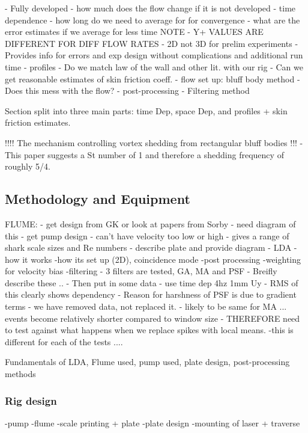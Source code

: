 \documentclass[12pt,oneside,a4paper]{article}
\begin{document}
-	Fully developed
		-	how much does the flow change if it is not developed
-	time dependence
		-	how long do we need to average for for convergence
		-	what are the error estimates if we average for less time
			NOTE - Y+ VALUES ARE DIFFERENT FOR DIFF FLOW RATES
-	2D not 3D for prelim experiments
		-	Provides info for errors and exp design without 
			complications and additional run time
-	profiles
		-	Do we match law of the wall and other lit. with our rig
		-	Can we get reasonable estimates of skin friction coeff.
-	flow set up:	bluff body method
		-	Does this mess with the flow?
-	post-processing
		-	Filtering method

Section split into three main parts: time Dep, space Dep, and profiles + skin friction estimates.

!!!!	The mechanism controlling vortex shedding from rectangular bluff bodies !!! - This paper suggests a St number of 1 and therefore a shedding frequency of roughly 5/4. 

\subsection{Methodology and Equipment}
FLUME:
	-	get design from GK or look at papers from Sorby
	-	need diagram of this
	-	get pump design	
			-	can't have velocity too low or high - gives a range of shark scale sizes and Re numbers
	-	describe plate and provide diagram
	-	LDA
		-how it works
		-how its set up (2D), coincidence mode
	-post processing
		-weighting for velocity bias
		-filtering
			-	3 filters are tested, GA, MA and PSF
					-	Breifly describe these ..
					-	Then put in some data  - use time dep 4hz 1mm Uy 
							-	RMS of this clearly shows dependency
							-	Reason for harshness of PSF is due to gradient terms - we have removed data, not replaced it. 
							-	likely to be same for MA ... events become relatively shorter compared to window size 
							- THEREFORE need to test against what happens when we replace spikes with local means. 
		-this is different for each of the tests ....

Fundamentals of LDA, Flume used, pump used, plate design, post-processing methods 
\subsubsection{Rig design}
-pump
-flume
-scale printing + plate
-plate design
-mounting of laser + traverse
\end{document}
